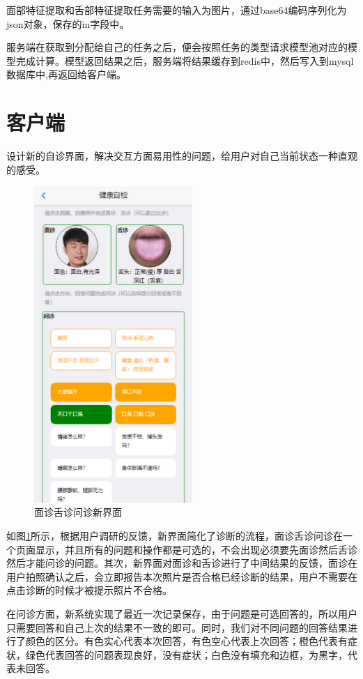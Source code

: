 面部特征提取和舌部特征提取任务需要的输入为图片，通过base64编码序列化为json对象，保存的in字段中。



服务端在获取到分配给自己的任务之后，便会按照任务的类型请求模型池对应的模型完成计算。模型返回结果之后，服务端将结果缓存到redis中，然后写入到mysql数据库中,再返回给客户端。

\section{客户端}
设计新的自诊界面，解决交互方面易用性的问题，给用户对自己当前状态一种直观的感受。
\begin{figure}[ht]
    \centering
    \includegraphics[height=12cm]{images/diag.png}
    \caption{面诊舌诊问诊新界面}
    \label{fig:diag_new}
\end{figure}

如图\ref{fig:diag_new}所示，根据用户调研的反馈，新界面简化了诊断的流程，面诊舌诊问诊在一个页面显示，并且所有的问题和操作都是可选的，不会出现必须要先面诊然后舌诊然后才能问诊的问题。其次，新界面对面诊和舌诊进行了中间结果的反馈，面诊在用户拍照确认之后，会立即报告本次照片是否合格已经诊断的结果，用户不需要在点击诊断的时候才被提示照片不合格。

在问诊方面，新系统实现了最近一次记录保存，由于问题是可选回答的，所以用户只需要回答和自己上次的结果不一致的即可。同时，我们对不同问题的回答结果进行了颜色的区分。有色实心代表本次回答，有色空心代表上次回答；橙色代表有症状，绿色代表回答的问题表现良好，没有症状；白色没有填充和边框，为黑字，代表未回答。

